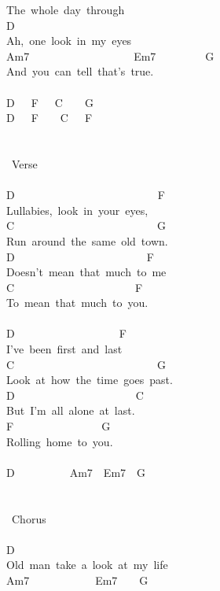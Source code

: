 {The\ whole\ day\ through\\
D\\
Ah,\ one\ look\ in\ my\ eyes\\
Am7\ \ \ \ \ \ \ \ \ \ \ \ \ \ \ \ \ \ \ Em7\ \ \ \ \ \ \ \ \ G\\
And\ you\ can\ tell\ that's\ true.\\
\\
D\ \ \ F\ \ \ C\ \ \ \ G\\
D\ \ \ F\ \ \ \ C\ \ \ F\\
\\
\\
\lbrack\ Verse\rbrack\\
\\
D\ \ \ \ \ \ \ \ \ \ \ \ \ \ \ \ \ \ \ \ \ \ \ \ \ \ F\\
Lullabies,\ look\ in\ your\ eyes,\\
C\ \ \ \ \ \ \ \ \ \ \ \ \ \ \ \ \ \ \ \ \ \ \ \ \ \ G\\
Run\ around\ the\ same\ old\ town.\\
D\ \ \ \ \ \ \ \ \ \ \ \ \ \ \ \ \ \ \ \ \ \ \ \ F\\
Doesn't\ mean\ that\ much\ to\ me\\
C\ \ \ \ \ \ \ \ \ \ \ \ \ \ \ \ \ \ \ \ \ \ F\\
To\ mean\ that\ much\ to\ you.\\
\\
D\ \ \ \ \ \ \ \ \ \ \ \ \ \ \ \ \ \ \ F\\
I've\ been\ first\ and\ last\\
C\ \ \ \ \ \ \ \ \ \ \ \ \ \ \ \ \ \ \ \ \ \ \ \ \ \ G\\
Look\ at\ how\ the\ time\ goes\ past.\\
D\ \ \ \ \ \ \ \ \ \ \ \ \ \ \ \ \ \ \ \ \ \ C\\
But\ I'm\ all\ alone\ at\ last.\\
F\ \ \ \ \ \ \ \ \ \ \ \ \ \ \ \ G\\
Rolling\ home\ to\ you.\\
\\
D\ \ \ \ \ \ \ \ \ \ Am7\ \ Em7\ \ G\\
\\
\\
\lbrack\ Chorus\rbrack\\
\\
D\\
Old\ man\ take\ a\ look\ at\ my\ life\\
Am7\ \ \ \ \ \ \ \ \ \ \ \ Em7\ \ \ \ G\\
}
